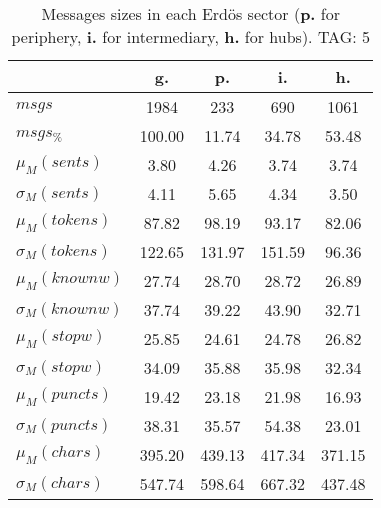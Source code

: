 \begin{table}[h!]
\begin{center}
\begin{tabular}{| l || c | c | c | c |}\hline
 & {\bf g.} & {\bf p.} & {\bf i.} & {\bf h.} \\\hline\hline
$msgs$ & 1984  & 233  & 690  & 1061 \\
$msgs_{\%}$ & 100.00  & 11.74  & 34.78  & 53.48 \\\hline
$\mu_M(sents)$ & 3.80  & 4.26  & 3.74  & 3.74 \\
$\sigma_M(sents)$ & 4.11  & 5.65  & 4.34  & 3.50 \\\hline
$\mu_M(tokens)$ & 87.82  & 98.19  & 93.17  & 82.06 \\
$\sigma_M(tokens)$ & 122.65  & 131.97  & 151.59  & 96.36 \\\hline
$\mu_M(knownw)$ & 27.74  & 28.70  & 28.72  & 26.89 \\
$\sigma_M(knownw)$ & 37.74  & 39.22  & 43.90  & 32.71 \\\hline
$\mu_M(stopw)$ & 25.85  & 24.61  & 24.78  & 26.82 \\
$\sigma_M(stopw)$ & 34.09  & 35.88  & 35.98  & 32.34 \\\hline
$\mu_M(puncts)$ & 19.42  & 23.18  & 21.98  & 16.93 \\
$\sigma_M(puncts)$ & 38.31  & 35.57  & 54.38  & 23.01 \\\hline
$\mu_M(chars)$ & 395.20  & 439.13  & 417.34  & 371.15 \\
$\sigma_M(chars)$ & 547.74  & 598.64  & 667.32  & 437.48 \\\hline
\end{tabular}
\caption{Messages sizes in each Erd\"os sector ({{\bf p.}} for periphery, {{\bf i.}} for intermediary, {{\bf h.}} for hubs). TAG: 5}
\end{center}
\end{table}